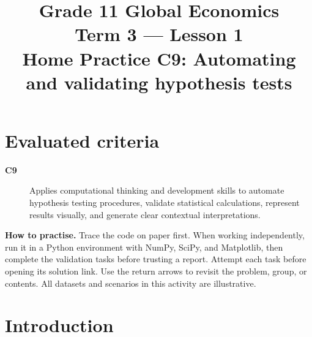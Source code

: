 \makeatletter
{}
\makeatother


\newcommand{\Pop}[1]{\HighlightStroke{GTenHLParameter}{#1}}
\newcommand{\Obs}[1]{\HighlightStroke{GTenHLValue}{#1}}
\newcommand{\Design}[1]{\HighlightStroke{GTenHLThird}{#1}}
\newcommand{\Result}[1]{\HighlightStroke{GTenHLOutcome}{#1}}

\title{Grade 11 Global Economics\\Term 3 --- Lesson 1\\Home Practice C9: Automating and validating hypothesis tests}
\author{}\date{}

\maketitle
\setcounter{tocdepth}{1}
\setcounter{secnumdepth}{2}
\label{toc}
\tableofcontents
\section*{Evaluated criteria}
\begin{description}
\item[\textbf{C9}] Applies computational thinking and development skills to automate hypothesis testing procedures, validate statistical calculations, represent results visually, and generate clear contextual interpretations.
\end{description}
\textbf{How to practise.} Trace the code on paper first. When working independently, run it in a Python environment with NumPy, SciPy, and Matplotlib, then complete the validation tasks before trusting a report. Attempt each task before opening its solution link. Use the return arrows to revisit the problem, group, or contents. All datasets and scenarios in this activity are illustrative.
\clearpage
\section{Introduction}\label{sec:introduction}
